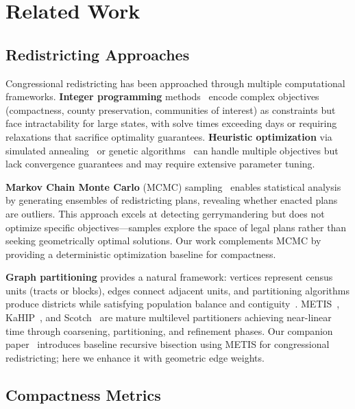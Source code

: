 \section{Related Work}

\subsection{Redistricting Approaches}

Congressional redistricting has been approached through multiple computational frameworks. \textbf{Integer programming} methods~\cite{garfinkel1970optimal,mehrotra1998optimal} encode complex objectives (compactness, county preservation, communities of interest) as constraints but face intractability for large states, with solve times exceeding days or requiring relaxations that sacrifice optimality guarantees. \textbf{Heuristic optimization} via simulated annealing~\cite{bozkaya2003zone} or genetic algorithms~\cite{bacao2005applying} can handle multiple objectives but lack convergence guarantees and may require extensive parameter tuning.

\textbf{Markov Chain Monte Carlo} (MCMC) sampling~\cite{duchin2018outlier,fifield2020automated} enables statistical analysis by generating ensembles of redistricting plans, revealing whether enacted plans are outliers. This approach excels at detecting gerrymandering but does not optimize specific objectives—samples explore the space of legal plans rather than seeking geometrically optimal solutions. Our work complements MCMC by providing a deterministic optimization baseline for compactness.

\textbf{Graph partitioning} provides a natural framework: vertices represent census units (tracts or blocks), edges connect adjacent units, and partitioning algorithms produce districts while satisfying population balance and contiguity~\cite{ricca2008local}. METIS~\cite{karypis1998metis}, KaHIP~\cite{sanders2013think}, and Scotch~\cite{pellegrini2008scotch} are mature multilevel partitioners achieving near-linear time through coarsening, partitioning, and refinement phases. Our companion paper~\cite{TODO-recursive-bisection} introduces baseline recursive bisection using METIS for congressional redistricting; here we enhance it with geometric edge weights.

\subsection{Compactness Metrics}


